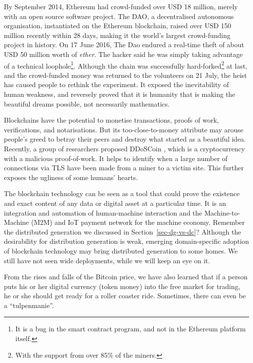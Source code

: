 By September 2014, Ethereum had crowd-funded over USD 18 million, merely with an open source software project. The DAO, a decentralised autonomous organisation, instantiated on the Ethereum blockchain, raised over USD 150 million recently within 28 days, making it the world's largest crowd-funding project in history. On 17 June 2016, The Dao endured a real-time theft of about USD 50 million worth of \emph{ether}. The hacker said he was simply taking advantage of a technical loophole\footnote{It is a bug in the smart contract program, and not in the Ethereum platform itself.}. Although the chain was successfully hard-forked\footnote{With the support from over 85\% of the miners.} at last, and the crowd-funded money was returned to the volunteers on 21 July, the heist has caused people to rethink the experiment. It exposed the inevitability of human weakness, and reversely proved that it is humanity that is making the beautiful dreams possible, not necessarily mathematics. 

Blockchains have the potential to monetise transactions, proofs of work, verifications, and notarisations. But its too-close-to-money attribute may arouse people's greed to betray their peers and destroy what started as a beautiful idea. Recently, a group of researchers proposed DDoSCoin \cite{ddoscoin}, which is a cryptocurrency with a malicious proof-of-work. It helps to identify when a large number of connections via TLS have been made from a miner to a victim site. This further exposes the ugliness of some humans' hearts. 

The blockchain technology can be seen as a tool that could prove the existence and exact content of any data or digital asset at a particular time. It is an integration and automation of human-machine interaction and the Machine-to-Machine (M2M) and IoT payment network for the machine economy. Remember the distributed generation we discussed in Section~\ref{sec-dg-vs-dc}?  Although the desirability for distribution generation is weak, emerging domain-specific adoption of blockchain technology \cite{dg-blockchain} may bring distributed generation to some homes. We still have not seen wide deployments, while we will keep an eye on it.

From the rises and falls of the Bitcoin price, we have also learned that if a person puts his or her digital currency (token money) into the free market for trading, he or she should get ready for a roller coaster ride. Sometimes, there can even be a ``tulpenmanie''. 

